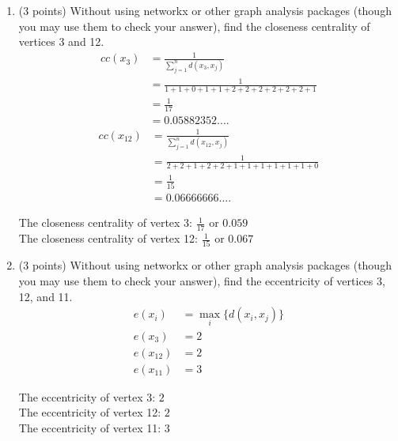 \documentclass[11pt]{article}
\begin{document}
\begin{enumerate}

    \item (3 points) Without using networkx or other graph analysis packages
    (though you may use them to check your answer), find the closeness
    centrality of vertices 3 and 12.
    \begin{align*}
        cc(x_{3}) &= \frac{1}{\sum_{j=1}^{n} d( x_3 , x_j )} \\
        &= \frac{1}{1 + 1 + 0 + 1 + 1 + 2 + 2 + 2 + 2 + 2 + 2 + 1} \\
        &= \frac{1}{17} \\
        &= 0.05882352....
    \end{align*}
    \begin{align*}
        cc(x_{12}) &= \frac{1}{\sum_{j=1}^{n} d( x_{12} , x_j )} \\
        &= \frac{1}{2+2+1+2+2+1+1+1+1+1+1+0} \\
        &= \frac{1}{15} \\
        &= 0.06666666....
    \end{align*}
    \begin{tcolorbox}[width=\linewidth,title=Problem 1 Answer - Closeness Centrality]
        The closeness centrality of vertex 3: $\frac{1}{17}$ or $0.059$ \\
        The closeness centrality of vertex 12: $\frac{1}{15}$ or $0.067$
    \end{tcolorbox}

    \newpage
    \item (3 points) Without using networkx or other graph analysis packages
    (though you may use them to check your answer), find the eccentricity of
    vertices 3, 12, and 11.
    \begin{align*}
        e(x_i) &= \max_{i} \lbrace d( x_{i} , x_{j} ) \rbrace \\
        e(x_3) &= 2 \\
        e(x_{12}) &= 2 \\
        e(x_{11}) &= 3
    \end{align*}
    \begin{tcolorbox}[width=\linewidth,title=Problem 2 Answer - Eccentricity]
        The eccentricity of vertex 3: $2$ \\
        The eccentricity of vertex 12: $2$ \\
        The eccentricity of vertex 11: $3$
    \end{tcolorbox}


\end{enumerate}
\end{document}
